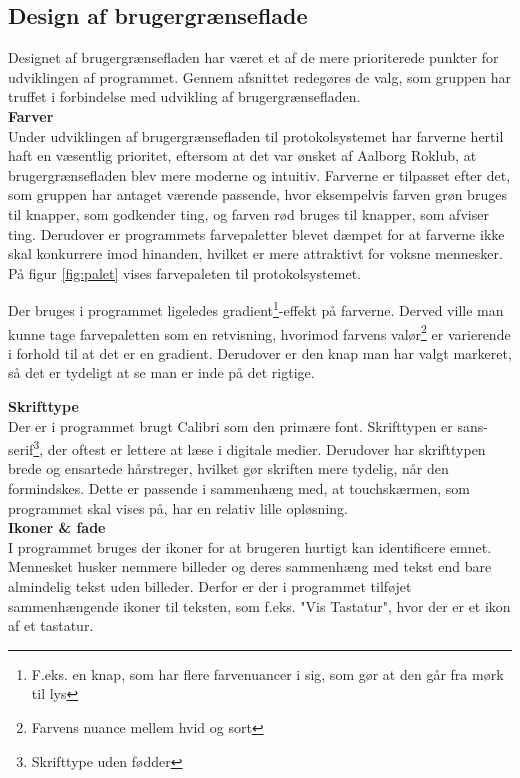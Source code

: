 \subsection{Design af brugergrænseflade}
\label{sec:imple_design}

Designet af brugergrænsefladen har været et af de mere prioriterede punkter for udviklingen af programmet. Gennem afsnittet redegøres de valg, som gruppen har truffet i forbindelse med udvikling af brugergrænsefladen. \\

\textbf{Farver}\\
Under udviklingen af brugergrænsefladen til protokolsystemet har farverne hertil haft en væsentlig prioritet, eftersom at det var ønsket af Aalborg Roklub, at brugergrænsefladen blev mere moderne og intuitiv. Farverne er tilpasset efter det, som gruppen har antaget værende passende, hvor eksempelvis farven grøn bruges til knapper, som godkender ting, og farven rød bruges til knapper, som afviser ting. Derudover er programmets farvepaletter blevet dæmpet for at farverne ikke skal konkurrere imod hinanden, hvilket er mere attraktivt for voksne mennesker. På figur \ref{fig:palet} vises farvepaleten til protokolsystemet. \cite{farve_design}\\


Der bruges i programmet ligeledes gradient\footnote{F.eks. en knap, som har flere farvenuancer i sig, som gør at den går fra mørk til lys}-effekt på farverne. Derved ville man kunne tage farvepaletten som en retvisning, hvorimod farvens valør\footnote{Farvens nuance mellem hvid og sort} er varierende i forhold til at det er en gradient. Derudover er den knap man har valgt markeret, så det er tydeligt at se man er inde på det rigtige.

\textbf{Skrifttype}\\
Der er i programmet brugt Calibri som den primære font. Skrifttypen er sans-serif\footnote{Skrifttype uden fødder}, der oftest er lettere at læse i digitale medier. Derudover har skrifttypen brede og ensartede hårstreger, hvilket gør skriften mere tydelig, når den formindskes. Dette er passende i sammenhæng med, at touchskærmen, som programmet skal vises på, har en relativ lille opløsning. \cite{skrifttype_design}\\

\textbf{Ikoner \& fade}\\
I programmet bruges der ikoner for at brugeren hurtigt kan identificere emnet. Mennesket husker nemmere billeder og deres sammenhæng med tekst end bare almindelig tekst uden billeder. \cite{design_hukommelsen} Derfor er der i programmet tilføjet sammenhængende ikoner til teksten, som f.eks. "Vis Tastatur", hvor der er et ikon af et tastatur.\\

